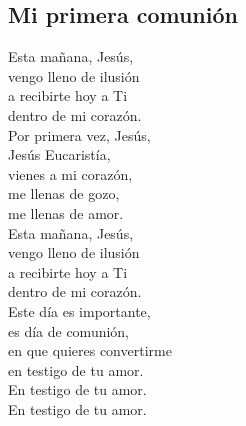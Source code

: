 \subsection{Mi primera comunión}

\begin{center}

{\Large
Esta mañana, Jesús, \\   
vengo lleno de ilusión\\
a recibirte hoy a Ti\\      
dentro de mi corazón.\\
\vspace{1em}
Por primera vez, Jesús,\\ 
Jesús Eucaristía, \\
vienes a mi corazón,\\ 
me llenas de gozo, \\   
me llenas de amor.\\
\vspace{1em}
Esta mañana, Jesús, \\   
vengo lleno de ilusión\\
a recibirte hoy a Ti\\      
dentro de mi corazón.\\
\vspace{1em}
Este día es importante,\\
es día de comunión,\\
en que quieres convertirme\\
en testigo de tu amor.\\
En testigo de tu amor.\\
En testigo de tu amor.\\
}
\end{center}